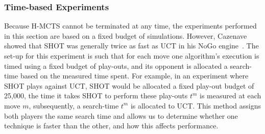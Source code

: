 \documentclass{kecsmstr}
\begin{document}
\subsubsection{Time-based Experiments}
\label{subsubsec:timeb}

Because H-MCTS cannot be terminated at any time, the experiments performed in this section are based on a fixed budget of simulations. However, Cazenave showed that SHOT was generally twice as fast as UCT in his NoGo engine~. The set-up for this experiment is such that for each move one algorithm's execution is timed using a fixed budget of play-outs, and its opponent is allocated a search-time based on the measured time spent. For example, in an experiment where SHOT plays against UCT, SHOT would be allocated a fixed play-out budget of 25,000, the time it takes SHOT to perform these play-outs $t^m$ is measured at each move $m$, subsequently, a search-time $t^m$ is allocated to UCT. This method assigns both players the same search time and allows us to determine whether one technique is faster than the other, and how this affects performance.

\begin{table}[ht]
\centering
\captionsetup{justification=centering,margin=1cm}
\tabcolsep=0.3cm
\vspace{3mm}
{\caption[H-MCTS Solver vs. MCTS-Solver, time-based.]{H-MCTS Solver vs. MCTS-Solver, time-based, random play-outs.\\ Win percentages with respect to H-MCTS, 1,000 games.} \label{tab:uct-s_hmcts-s_time}}
\end{table}
\end{document}
